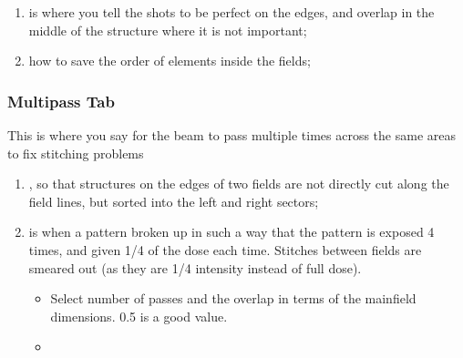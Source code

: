 \begin{enumerate}
\begin{itemize}
{      than the main field};
  \item {} to see how exposure will jump between the fields;
  \item {} to make sure that important elements are in the field center.
  \end{itemize}
\item {}  is where you tell the shots to be  perfect on the edges, and
  overlap in the middle of the structure where it is not important; 
\item {}  how to  save the order  of elements inside  the fields;
\end{enumerate}

  \subsubsection{Multipass Tab}
  This is  where you say  for the beam  to pass  multiple times across  the same areas  to fix
  stitching problems
  \begin{enumerate}
  \item {},  so that structures on  the edges of two fields  are not directly
    cut   along  the   field   lines,  but   sorted   into  the   left   and  right   sectors;
  \item {} is when a pattern broken up  in such a way
    that the pattern is exposed 4 times, and given 1/4 of the dose each time. Stitches between
    fields   are  smeared   out  (as   they  are   1/4  intensity   instead  of   full  dose).
    \begin{itemize}
    \item Select number of passes and the overlap in terms of the mainfield dimensions. 0.5 is
      a good value.
    \item {}
    \end{itemize}
  \end{enumerate}

